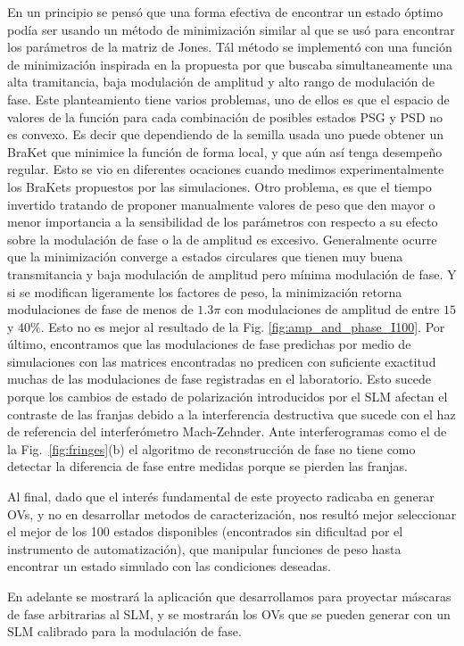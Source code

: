 En un principio se pensó que una forma efectiva de encontrar un estado
óptimo podía ser usando un método de minimización similar al que se
usó para encontrar los parámetros de la matriz de Jones. Tál método se
implementó con una función de minimización inspirada en la propuesta
por  que buscaba simultaneamente
una alta tramitancia, baja modulación de amplitud y alto rango de
modulación de fase. Este planteamiento tiene varios problemas, uno de
ellos es que el espacio de valores de la función para cada
combinación de posibles estados PSG y PSD no es convexo. Es decir que
dependiendo de la semilla usada uno puede obtener un BraKet que
minimice la función de forma local, y que aún así tenga desempeño
regular. Esto se vio en diferentes ocaciones cuando medimos
experimentalmente los BraKets propuestos por las simulaciones. 
Otro problema, es que el tiempo invertido tratando de proponer
manualmente valores de peso que den mayor o menor importancia a la
sensibilidad de los parámetros con respecto a su efecto sobre la
modulación de fase o la de amplitud es excesivo. Generalmente ocurre
que la minimización 
converge a estados circulares que tienen muy buena transmitancia y
baja modulación de amplitud pero mínima modulación de fase. Y si se
modifican ligeramente los factores de peso, la minimización retorna
modulaciones de fase de menos de $1.3\pi$ con modulaciones de amplitud
de entre $15$ y $40\%$. Esto no es mejor al resultado de la
Fig. \ref{fig:amp_and_phase_I100}. Por último, encontramos que las
modulaciones de fase predichas por medio de simulaciones con las
matrices encontradas no predicen con suficiente exactitud muchas de las
modulaciones de fase registradas en el laboratorio. Esto sucede porque los
cambios de estado de polarización introducidos por el SLM afectan el
contraste de las franjas debido a la interferencia destructiva que
sucede con el haz de referencia del interferómetro
Mach-Zehnder. Ante interferogramas como el de la
Fig.~\ref{fig:fringes}(b) el algoritmo de reconstrucción de fase no
tiene como detectar la diferencia de fase entre medidas porque se
pierden las franjas.

Al final, dado que el interés fundamental de este proyecto radicaba en generar
OVs, y no en desarrollar metodos de caracterización, nos resultó mejor
seleccionar el mejor de los 100 estados disponibles (encontrados sin
dificultad por el instrumento de automatización), 
que manipular funciones de peso hasta encontrar un estado simulado con
las condiciones deseadas.

En adelante se mostrará la aplicación que desarrollamos para proyectar
máscaras de fase arbitrarias al SLM, y se mostrarán los OVs que se
pueden generar con un SLM calibrado para la modulación de fase. 

